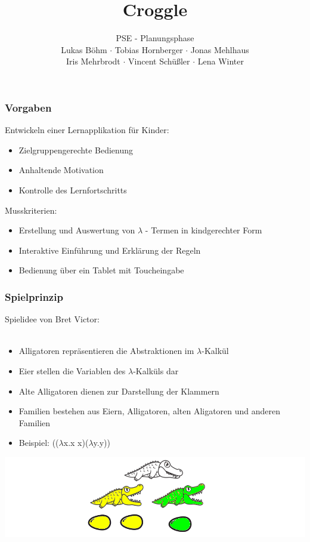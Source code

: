 \documentclass[t]{beamer}
\title{Croggle}
\subtitle{PSE - Planungsphase \\[0.3cm]
Lukas Böhm $\cdot$ Tobias Hornberger $\cdot$ Jonas Mehlhaus \\ Iris Mehrbrodt  $\cdot$ Vincent Schüßler $\cdot$ Lena Winter}
\institute[IPD]{Institut für Programmstruktutren und Datenorganisation}
\begin{document}
\begin{frame}
        \maketitle
\end{frame}

\begin{frame}
	\frametitle{Vorgaben}
	Entwickeln einer Lernapplikation für Kinder:\\
	\begin{itemize}
		\item Zielgruppengerechte Bedienung
		\item Anhaltende Motivation
		\item Kontrolle des Lernfortschritts
	\end{itemize}


	Musskriterien:\\
	\begin{itemize}
		\item Erstellung und Auswertung von \(\lambda\) - Termen in kindgerechter Form
		\item Interaktive Einführung und Erklärung der Regeln
		\item Bedienung über ein Tablet mit Toucheingabe
	\end{itemize}
\end{frame}

\begin{frame}
	\frametitle{Spielprinzip}
	Spielidee von Bret Victor: \\
     \\
	\begin{itemize}
		\item Alligatoren repräsentieren die Abstraktionen im \(\lambda\)-Kalkül
		\item Eier stellen die Variablen des \(\lambda\)-Kalküls dar
		\item Alte Alligatoren dienen zur Darstellung der Klammern
		\item Familien bestehen aus Eiern, Alligatoren, alten Aligatoren und anderen Familien 
		\item Beispiel: ((\(\lambda\)x.x x)(\(\lambda\)y.y))
	\end{itemize}
	\includegraphics[width=\textwidth]{Spielelemente.png}
\end{frame}
\end{document}
